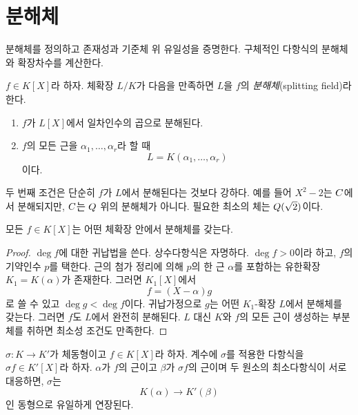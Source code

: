 \section{분해체}
\label{sec:splitting-fields}

\begin{learninggoal}
분해체를 정의하고 존재성과 기준체 위 유일성을 증명한다. 구체적인 다항식의 분해체와 확장차수를 계산한다.
\end{learninggoal}

\begin{definition}[분해체]
$f\in K[X]$라 하자. 체확장 $L/K$가 다음을 만족하면 $L$을 $f$의 \emph{분해체}(splitting field)라 한다.
\begin{enumerate}[label=(\roman*)]
  \item $f$가 $L[X]$에서 일차인수의 곱으로 분해된다.
  \item $f$의 모든 근을 $\alpha_1,\dots,\alpha_r$라 할 때
  \[
    L=K(\alpha_1,\dots,\alpha_r)
  \]
  이다.
\end{enumerate}
\end{definition}

두 번째 조건은 단순히 $f$가 $L$에서 분해된다는 것보다 강하다. 예를 들어 $X^2-2$는 $C$에서 분해되지만, $C$는 $Q$ 위의 분해체가 아니다. 필요한 최소의 체는 $Q(\sqrt2)$이다.

\begin{theorem}[분해체의 존재]
모든 $f\in K[X]$는 어떤 체확장 안에서 분해체를 갖는다.
\end{theorem}

\begin{proof}
$\deg f$에 대한 귀납법을 쓴다. 상수다항식은 자명하다. $\deg f>0$이라 하고, $f$의 기약인수 $p$를 택한다. 근의 첨가 정리에 의해 $p$의 한 근 $\alpha$를 포함하는 유한확장 $K_1=K(\alpha)$가 존재한다. 그러면 $K_1[X]$에서
\[
  f=(X-\alpha)g
\]
로 쓸 수 있고 $\deg g<\deg f$이다. 귀납가정으로 $g$는 어떤 $K_1$-확장 $L$에서 분해체를 갖는다. 그러면 $f$도 $L$에서 완전히 분해된다. $L$ 대신 $K$와 $f$의 모든 근이 생성하는 부분체를 취하면 최소성 조건도 만족한다.
\end{proof}

\begin{lemma}
$\sigma:K\to K'$가 체동형이고 $f\in K[X]$라 하자. 계수에 $\sigma$를 적용한 다항식을 $\sigma f\in K'[X]$라 하자. $\alpha$가 $f$의 근이고 $\beta$가 $\sigma f$의 근이며 두 원소의 최소다항식이 서로 대응하면, $\sigma$는
\[
  K(\alpha)\longrightarrow K'(\beta)
\]
인 동형으로 유일하게 연장된다.
\end{lemma}

